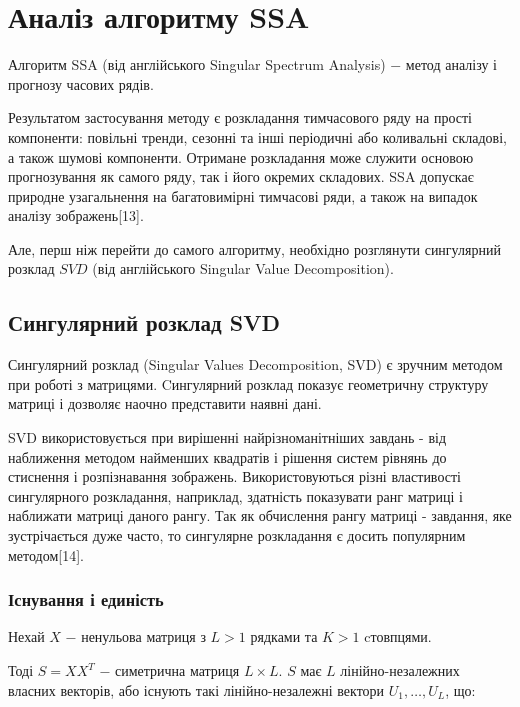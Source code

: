 \section{Аналіз алгоритму SSA}
\label{sec:SSA}

Алгоритм SSA (від англійського Singular Spectrum Analysis) $-$ метод аналізу і прогнозу часових рядів. 

Результатом застосування методу є розкладання тимчасового ряду на прості компоненти: повільні тренди, сезонні та інші періодичні або коливальні складові, а також шумові компоненти. Отримане розкладання може служити основою прогнозування як самого ряду, так і його окремих складових. SSA допускає природне узагальнення на багатовимірні тимчасові ряди, а також на випадок аналізу зображень[13].

Але, перш ніж перейти до самого алгоритму, необхідно розглянути сингулярний розклад $SVD$ (від англійського Singular Value Decomposition).

\subsection{Сингулярний розклад SVD}

Сингулярний розклад (Singular Values Decomposition, SVD) є зручним методом при роботі з матрицями. Cингулярний розклад показує геометричну структуру матриці і дозволяє наочно представити наявні дані. 

SVD використовується при вирішенні найрізноманітніших завдань - від наближення методом найменших квадратів і рішення систем рівнянь до стиснення і розпізнавання зображень. Використовуються різні властивості сингулярного розкладання, наприклад, здатність показувати ранг матриці і наближати матриці даного рангу. Так як обчислення рангу матриці - завдання, яке зустрічається дуже часто, то сингулярне розкладання є досить популярним методом[14].

\subsubsection{Існування і единість}

Нехай $X$ $-$ ненульова матриця з $L > 1$ рядками та $K > 1$ cтовпцями.

Тоді $S = XX^{T}$ $-$ симетрична матриця $L \times L$. $S$ має $L$ лінійно-незалежних власних векторів, або існують такі лінійно-незалежні вектори $U_{1}, \dots, U_{L}$, що:

